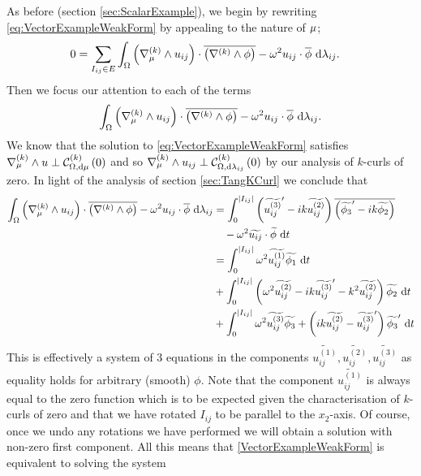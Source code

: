 As before (section \ref{sec:ScalarExample}), we begin by rewriting \eqref{eq:VectorExampleWeakForm} by appealing to the nature of $\mu$;
\begin{align} \label{eq:VectorExampleSumOfInts}
	0 &= \sum_{I_{ij}\in E}\int_{\Omega}\left( \nabla_{\mu}^{(k)}\wedge u_{ij} \right)\cdot\overline{\left( \nabla_{}^{(k)}\wedge\phi \right)} - \omega^2 u_{ij}\cdot\overline{\phi} \ \mathrm{d}\lambda_{ij}.
\end{align}
Then we focus our attention to each of the terms
\begin{align*}
	\int_{\Omega}\left( \nabla_{\mu}^{(k)}\wedge u_{ij} \right)\cdot\overline{\left( \nabla_{}^{(k)}\wedge\phi \right)} - \omega^2 u_{ij}\cdot\overline{\phi} \ \mathrm{d}\lambda_{ij}.
\end{align*}
We know that the solution to \eqref{eq:VectorExampleWeakForm} satisfies $\nabla_{\mu}^{(k)}\wedge u \perp \mathcal{C}_{ \Omega, \mathrm{d}\mu}^{(k)}\left( 0 \right)$ and so $\nabla_{\mu}^{(k)}\wedge u_{ij} \perp \mathcal{C}_{ \Omega, \mathrm{d}\lambda_{ij}}^{(k)}\left( 0 \right)$ by our analysis of $k$-curls of zero.
In light of the analysis of section \ref{sec:TangKCurl} we conclude that
\begin{align*}
	\int_{\Omega}\left( \nabla_{\mu}^{(k)}\wedge u_{ij} \right)\cdot\overline{\left( \nabla_{}^{(k)}\wedge\phi \right)} - \omega^2 u_{ij}\cdot\overline{\phi} \ \mathrm{d}\lambda_{ij}
	&= \int_0^{\lvert I_{ij} \rvert} \left( \widetilde{u_{ij}^{(3)}}' - ik\widetilde{u_{ij}^{(2)}} \right)\overline{\left( \widetilde{\phi_3}' - ik\widetilde{\phi_2} \right)} \\
	&\quad- \omega^2\widetilde{u_{ij}}\cdot\widetilde{\phi} \ \mathrm{d} t \\
	&= \int_0^{\lvert I_{ij} \rvert} \omega^2\widetilde{u_{ij}^{(1)}}\widetilde{\phi_1} \ \mathrm{d} t \\
	&+ \int_0^{\lvert I_{ij} \rvert} \left( \omega^2\widetilde{u_{ij}^{(2)}} - ik\widetilde{u_{ij}^{(3)}}' - k^2\widetilde{u_{ij}^{(2)}} \right)\widetilde{\phi_2} \ \mathrm{d} t \\
	&+ \int_0^{\lvert I_{ij} \rvert} \omega^2\widetilde{u_{ij}^{(3)}}\widetilde{\phi_3} + \left( ik\widetilde{u_{ij}^{(2)}} - \widetilde{u_{ij}^{(3)}}' \right)\widetilde{\phi_3}' \ \mathrm{d} t
\end{align*}
This is effectively a system of 3 equations in the components $\widetilde{u_{ij}^{(1)}},\widetilde{u_{ij}^{(2)}},\widetilde{u_{ij}^{(3)}}$ as equality holds for arbitrary (smooth) $\phi$.
Note that the component $\widetilde{u_{ij}^{(1)}}$ is always equal to the zero function which is to be expected given the characterisation of $k$-curls of zero and that we have rotated $I_{ij}$ to be parallel to the $x_2$-axis.
Of course, once we undo any rotations we have performed we will obtain a solution with non-zero first component.
All this means that \eqref{VectorExampleWeakForm} is equivalent to solving the system
